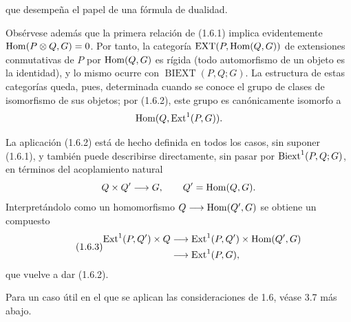 
que desempeña el papel de una fórmula de dualidad.

Obsérvese además que la primera relación de (1.6.1) implica
evidentemente $\Hom(P\otimes Q,G)=0$. Por tanto, la categoría
$\operatorname{EXT}(P,\uHom(Q,G))$ de extensiones conmutativas de $P$
por $\uHom(Q,G)$ es rígida (todo automorfismo de un objeto es la
identidad), y lo mismo ocurre con $\operatorname{BIEXT}(P,Q;G)$. La
estructura de estas categorías queda, pues, determinada cuando se
conoce el grupo de clases de isomorfismo de sus objetos; por (1.6.2),
este grupo es canónicamente isomorfo a
\[
 \Hom(Q,\uExt^1(P,\sisi{Q}{G})).
\]

La aplicación (1.6.2) está de hecho definida en todos los casos, sin
suponer (1.6.1), y también puede describirse directamente, sin pasar
por $\Biext^1(P,Q;G)$, en términos del acoplamiento natural
\[
 Q\times Q'\longrightarrow G,
 \qquad Q'=\uHom(Q,G).
\]
Interpretándolo como un homomorfismo
$Q\longrightarrow\uHom(Q',G)$ se obtiene un compuesto
\begin{equation}\tag{1.6.3}
\begin{split}
 \Ext^1(P,Q')\times Q
 &\longrightarrow
 \Ext^1(P,Q')\times\Hom(Q',G)\\
 &\longrightarrow
 \Ext^1(P,G),
\end{split}
\end{equation}
que vuelve a dar (1.6.2).

Para un caso útil en el que se aplican las consideraciones de 1.6,
véase 3.7 más abajo.
